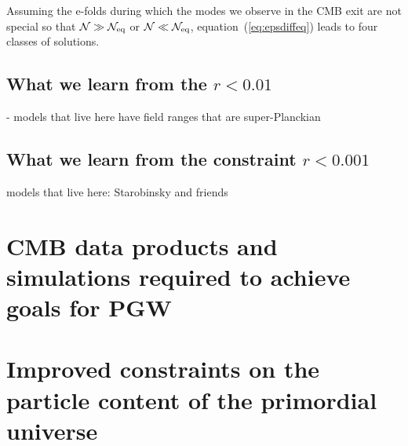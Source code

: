 Assuming the e-folds during which the modes we observe in the CMB exit are not special so that $\mathcal{N}\gg\mathcal{N}_{\rm eq}$ or $\mathcal{N}\ll\mathcal{N}_{\rm eq}$, equation~(\ref{eq:epsdiffeq}) leads to four classes of solutions. 

\subsection{What we learn from the $r<0.01$}
- models that live here have field ranges that are super-Planckian



\subsection{What we learn from the constraint $r<0.001$}

models that live here: Starobinsky and friends

\section{CMB data products and simulations required to achieve goals for PGW}
\label{sec:needs}

\section{Improved constraints on the particle content of the primordial universe}
\label{sec:scalar}

